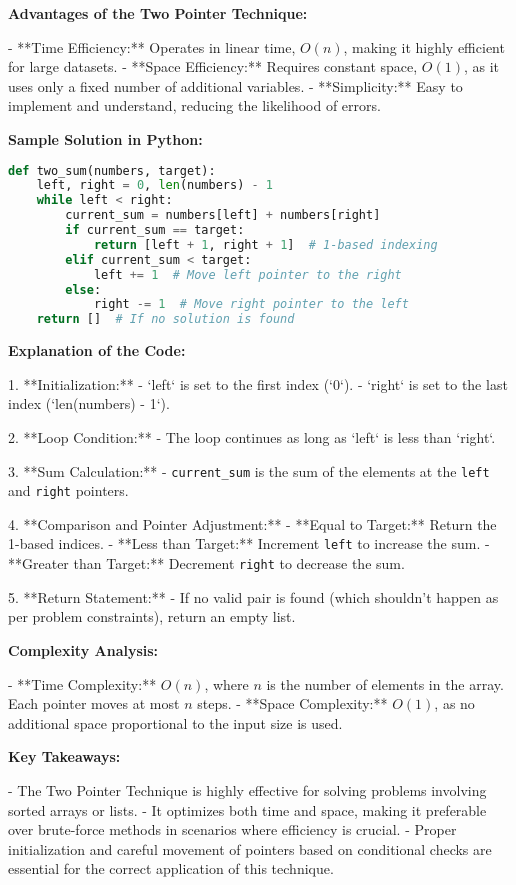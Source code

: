 \textbf{Advantages of the Two Pointer Technique:}

- **Time Efficiency:** Operates in linear time, \(O(n)\), making it highly efficient for large datasets.
- **Space Efficiency:** Requires constant space, \(O(1)\), as it uses only a fixed number of additional variables.
- **Simplicity:** Easy to implement and understand, reducing the likelihood of errors.

\textbf{Sample Solution in Python:}

\begin{lstlisting}[language=Python, caption={Two Pointer Solution for Pair Sum Problem}]
def two_sum(numbers, target):
    left, right = 0, len(numbers) - 1
    while left < right:
        current_sum = numbers[left] + numbers[right]
        if current_sum == target:
            return [left + 1, right + 1]  # 1-based indexing
        elif current_sum < target:
            left += 1  # Move left pointer to the right
        else:
            right -= 1  # Move right pointer to the left
    return []  # If no solution is found
\end{lstlisting}

\textbf{Explanation of the Code:}

1. **Initialization:**
   - `left` is set to the first index (`0`).
   - `right` is set to the last index (`len(numbers) - 1`).

2. **Loop Condition:**
   - The loop continues as long as `left` is less than `right`.

3. **Sum Calculation:**
   - \texttt{current\_sum} is the sum of the elements at the \texttt{left} and \texttt{right} pointers.

4. **Comparison and Pointer Adjustment:**
   - **Equal to Target:** Return the 1-based indices.
   - **Less than Target:** Increment \texttt{left} to increase the sum.
   - **Greater than Target:** Decrement \texttt{right} to decrease the sum.

5. **Return Statement:**
   - If no valid pair is found (which shouldn't happen as per problem constraints), return an empty list.

\textbf{Complexity Analysis:}

- **Time Complexity:** \(O(n)\), where \(n\) is the number of elements in the array. Each pointer moves at most \(n\) steps.
- **Space Complexity:** \(O(1)\), as no additional space proportional to the input size is used.

\textbf{Key Takeaways:}

- The Two Pointer Technique is highly effective for solving problems involving sorted arrays or lists.
- It optimizes both time and space, making it preferable over brute-force methods in scenarios where efficiency is crucial.
- Proper initialization and careful movement of pointers based on conditional checks are essential for the correct application of this technique.

